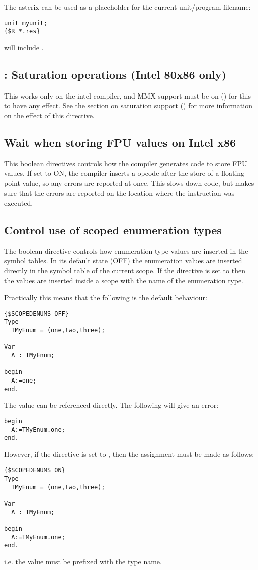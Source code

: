 The asterix can be used as a placeholder for the current unit/program filename:
\begin{verbatim}
unit myunit;
{$R *.res}
\end{verbatim}
will include .

\subsection{ : Saturation operations (Intel 80x86 only)}

This works only on the intel compiler, and MMX support must be on
() for this to have any effect. See the section on
saturation support () for more information
on the effect of this directive.

\subsection{ Wait when storing FPU values on Intel x86}
This boolean directives controls how the compiler generates code to store
FPU values. If set to ON, the compiler inserts a  opcode after
the store of a floating point value, so any errors are reported at once.
This slows down code, but makes sure that the errors are reported on the
location where the instruction was executed.

\subsection{ Control use of scoped enumeration types}
The boolean  directive controls how enumeration type values 
are inserted in the symbol tables. In its default state (OFF) the
enumeration values are inserted directly in the symbol table of the current
scope. If the directive is set to  then the values are inserted
inside a scope with the name of the enumeration type.

Practically this means that the following is the default behaviour:
\begin{verbatim}
{$SCOPEDENUMS OFF}
Type
  TMyEnum = (one,two,three);

Var
  A : TMyEnum;

begin
  A:=one;
end.
\end{verbatim}
The value  can be referenced directly. The following will give an
error:
\begin{verbatim}
begin
  A:=TMyEnum.one;
end.
\end{verbatim}
However, if the  directive is set to , then the
assignment must be made as follows:
\begin{verbatim}
{$SCOPEDENUMS ON}
Type
  TMyEnum = (one,two,three);

Var
  A : TMyEnum;

begin
  A:=TMyEnum.one;
end.
\end{verbatim}
i.e. the value must be prefixed with the type name.

